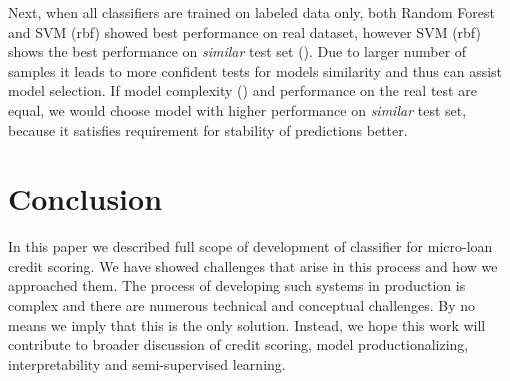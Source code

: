 \documentclass{article}
\begin{document}
Next, when all classifiers are trained on labeled data only, both Random Forest and SVM (rbf) showed best performance on real dataset, however SVM (rbf) shows the best performance on \textit{similar} test set (). Due to larger number of samples it leads to more confident tests for models similarity and thus can assist model selection. If model complexity () and performance on the real test are equal, we would choose model with higher performance on \textit{similar} test set, because it satisfies requirement for stability of predictions better.

\section{Conclusion}
In this paper we described full scope of development of classifier for micro-loan credit scoring. We have showed challenges that arise in this process and how we approached them. The process of developing such systems in production is complex and there are numerous technical and conceptual challenges. By no means we imply that this is the only solution. Instead, we hope this work will contribute to broader discussion of credit scoring, model productionalizing, interpretability and semi-supervised learning.
\end{document}
